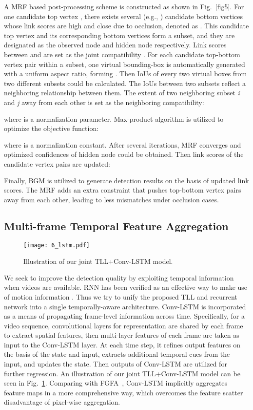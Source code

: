 \documentclass[runningheads]{llncs}
\begin{document}
A MRF based post-processing scheme is constructed as shown in Fig.~\ref{fig5}. For one candidate top vertex , there exists several (e.g., ) candidate bottom vertices whose link scores are high and close due to occlusion, denoted as . This candidate top vertex and its corresponding bottom vertices form a subset, and they are designated as the observed node and hidden node respectively. Link scores  between  and  are set as the joint compatibility . For each candidate top-bottom vertex pair  within a subset, one virtual bounding-box is automatically generated with a uniform aspect ratio, forming . Then IoUs of every two virtual boxes from two different subsets could be calculated. The IoUs between two subsets reflect a neighboring relationship between them. The extent of two neighboring subset \textit{i} and \textit{j} away from each other is set as the neighboring compatibility: 

where  is a normalization parameter. Max-product algorithm is utilized to optimize the objective function:

where  is a normalization constant. After several iterations, MRF converges and optimized confidences  of hidden node  could be obtained. Then link scores of the candidate vertex pairs  are updated: 

Finally, BGM is utilized to generate detection results on the basis of updated link scores. The MRF adds an extra constraint that pushes top-bottom vertex pairs away from each other, leading to less mismatches under occlusion cases.

\subsection{Multi-frame Temporal Feature Aggregation}
\begin{figure}[t]
	\centering
	\texttt{[image: 6\_lstm.pdf]}
	\caption{Illustration of our joint TLL+Conv-LSTM model.}
	\label{fig6}
\end{figure}
We seek to improve the detection quality by exploiting temporal information when videos are available. RNN has been verified as an effective way to make use of motion information \cite{VC,VAR}. Thus we try to unify the proposed TLL and recurrent network into a single temporally-aware architecture. Conv-LSTM \cite{ConvLSTM} is incorporated as a means of propagating frame-level information across time. Specifically, for a video sequence, convolutional layers for representation are shared by each frame to extract spatial features, then multi-layer features of each frame are taken as input to the Conv-LSTM layer. At each time step, it refines output features on the basis of the state and input, extracts additional temporal cues from the input, and updates the state. Then outputs of Conv-LSTM are utilized for further regression. An illustration of our joint TLL+Conv-LSTM model can be seen in Fig.~\ref{fig6}. Comparing with FGFA~\cite{FGFA}, Conv-LSTM implicitly aggregates feature maps in a more comprehensive way, which overcomes the feature scatter disadvantage of pixel-wise aggregation.
\end{document}
